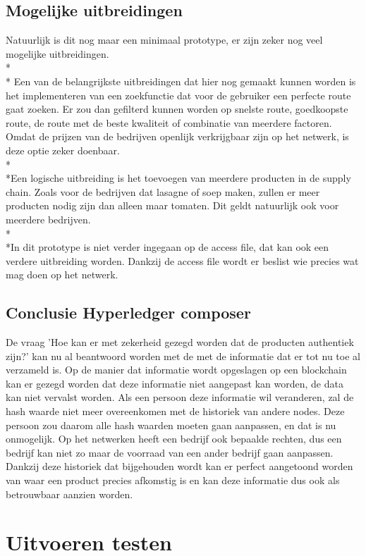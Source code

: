 \documentclass[fleqn,a4paper,12pt]{book}
\begin{document}
\section{Mogelijke uitbreidingen}
Natuurlijk is dit nog maar een minimaal prototype, er zijn zeker nog veel mogelijke uitbreidingen.\\*\\*
Een van de belangrijkste uitbreidingen dat hier nog gemaakt kunnen worden is het implementeren van een zoekfunctie dat voor de gebruiker een perfecte route gaat zoeken. Er zou dan gefilterd kunnen worden op snelste route, goedkoopste route, de route met de beste kwaliteit of combinatie van meerdere factoren. Omdat de prijzen van de bedrijven openlijk verkrijgbaar zijn op het netwerk, is deze optie zeker doenbaar.\\*\\*Een logische uitbreiding is het toevoegen van meerdere producten in de supply chain. Zoals voor de bedrijven dat lasagne of soep maken, zullen er meer producten nodig zijn dan alleen maar tomaten. Dit geldt natuurlijk ook voor meerdere bedrijven.\\*\\*In dit prototype is niet verder ingegaan op de access file, dat kan ook een verdere uitbreiding worden. Dankzij de access file wordt er beslist wie precies wat mag doen op het netwerk.

\section{Conclusie Hyperledger composer}
De vraag 'Hoe kan er met zekerheid gezegd worden dat de producten authentiek zijn?' kan nu al beantwoord worden met de met de informatie dat er tot nu toe al verzameld is. Op de manier dat informatie wordt opgeslagen op een blockchain kan er gezegd worden dat deze informatie niet aangepast kan worden, de data kan niet vervalst worden. Als een persoon deze informatie wil veranderen, zal de hash waarde niet meer overeenkomen met de historiek van andere nodes. Deze persoon zou daarom alle hash waarden moeten gaan aanpassen, en dat is nu onmogelijk. Op het netwerken heeft een bedrijf ook bepaalde rechten, dus een bedrijf kan niet zo maar de voorraad van een ander bedrijf gaan aanpassen. Dankzij deze historiek dat bijgehouden wordt kan er perfect aangetoond worden van waar een product precies afkomstig is en kan deze informatie dus ook als betrouwbaar aanzien worden.

\chapter{Uitvoeren testen}
\end{document}
